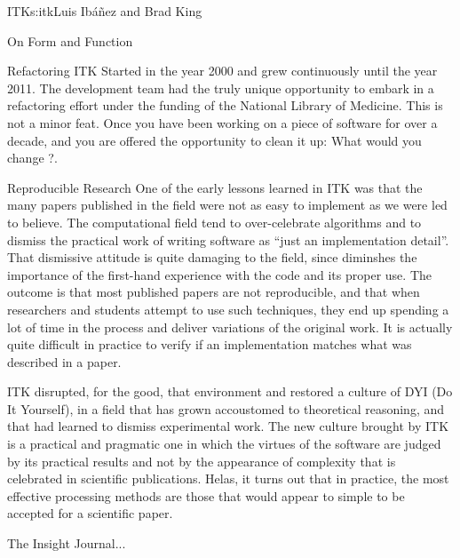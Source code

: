 \begin{aosachapter}{ITK}{s:itk}{Luis Ib\'{a}\~{n}ez and Brad King}
\begin{aosasect1}{On Form and Function}
\end{aosasect1}

\begin{aosasect1}{Refactoring}
ITK Started in the year 2000 and grew continuously until the year
2011. The development team had the truly unique opportunity to embark
in a refactoring effort under the funding of the National Library of
Medicine. This is not a minor feat. Once you have been working on a
piece of software for over a decade, and you are offered the
opportunity to clean it up: What would you change ?.
\end{aosasect1}

\begin{aosasect1}{Reproducible Research}
One of the early lessons learned in ITK was that the many papers
published in the field were not as easy to implement as we were led to
believe. The computational field tend to over-celebrate algorithms and
to dismiss the practical work of writing software as ``just an
implementation detail''. That dismissive attitude is quite damaging to
the field, since diminshes the importance of the first-hand experience
with the code and its proper use. The outcome is that most published papers
are not reproducible, and that when researchers and students attempt to use
such techniques, they end up spending a lot of time in the process and deliver
variations of the original work. It is actually quite difficult in practice
to verify if an implementation matches what was described in a paper.

ITK disrupted, for the good, that environment and restored a culture
of DYI (Do It Yourself), in a field that has grown accoustomed to
theoretical reasoning, and that had learned to dismiss experimental
work. The new culture brought by ITK is a practical and pragmatic one
in which the virtues of the software are judged by its practical results
and not by the appearance of complexity that is celebrated in scientific
publications. Helas, it turns out that in practice, the most effective
processing methods are those that would appear to simple to be accepted
for a scientific paper.

The Insight Journal...
\end{aosasect1}

\end{aosachapter}
